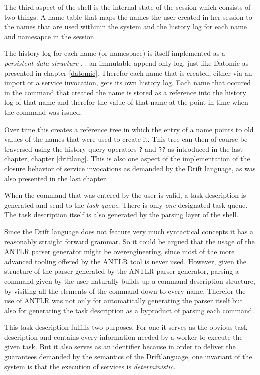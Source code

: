 The third aspect of the shell is the internal state of the session
which consists of two things. A name table that maps the names the
user created in her session to the names that are used withinin the
system and the history log for each name and namesapce in the session.

The history log for each name (or namespace) is itself implemented as a
\textit{persistent data structure} \cite{pds-paper}, \cite{pds-book}:
an immutable append-only log, just like Datomic as presented in
chapter \ref{datomic}. Therefor each name that is
created, either via an import or a service invocation, gets its
own history log. Each name that occured in the command
that created the name is stored as a reference into the
history log of that name and therefor the value of that name
at the point in time when the command was issued.

Over time this creates a reference tree in which the entry of a name
points to old values of the names that were used to create it. This
tree can then of course be traversed using the history query
operators \texttt{?} and \texttt{??} as introduced in the last
chapter, chapter \ref{driftlang}. This is also one aspect of the
implementation of the closure behavior of service invocations as
demanded by the Drift language, as was also presented in the last
chapter.
\newline

When the command that was entered by the user is valid, a
task description is generated and send to the \textit{task queue}.
There is only  \textit{one} designated task queue. The task description
itself is also generated by the parsing layer of the shell.

Since the Drift language does not feature very much syntactical
concepts it has a reasonably straight forward grammar. So it could
be argued that the usage of the ANTLR parser generator might be
overengineering, since most of the more advanced tooling offered
by the ANTLR tool is never used. However, given the structure
of the parser generated by the ANTLR parser generator, parsing
a command given by the user naturally builds up a command
description structure, by visiting all the elements of the
command down to every name. Therefor the use of ANTLR was not only for
automatically generating the parser itself but also for generating the
task description as a byproduct of parsing each command.

This task description fulfills two purposes. For one it serves
as the obvious task description and contains every information
needed by a worker to execute the given task. But it also serves
as an identifier because in order to deliver the guarantees
demanded by the semantics of the  Driftlanguage, one invariant of
the system is that the execution of services is \textit{deterministic}.

